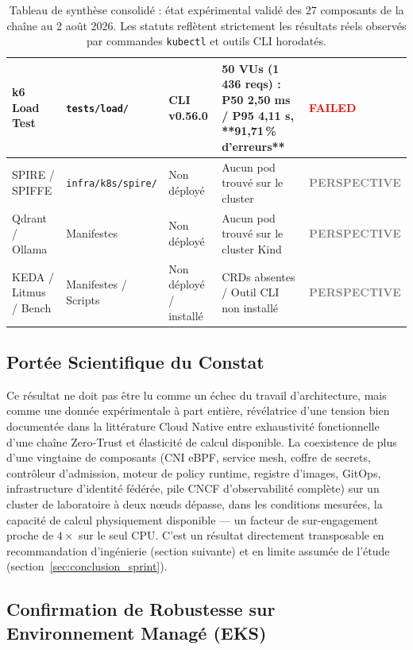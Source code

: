 \begin{table}[H]
\begin{tabular}{@{}p{2.6cm}p{2.2cm}p{2.2cm}p{4.8cm}p{2.0cm}@{}}
k6 Load Test & \texttt{tests/load/} & CLI v0.56.0 & 50 VUs (1\,436 reqs) : P50 2,50 ms / P95 4,11 s, **91,71\,\% d'erreurs** & \textcolor{red}{\textbf{FAILED}} \\
\midrule
SPIRE / SPIFFE & \texttt{infra/k8s/spire/} & Non déployé & Aucun pod trouvé sur le cluster & \textcolor{gray}{\textbf{PERSPECTIVE}} \\
Qdrant / Ollama & Manifestes & Non déployé & Aucun pod trouvé sur le cluster Kind & \textcolor{gray}{\textbf{PERSPECTIVE}} \\
KEDA / Litmus / Bench & Manifestes / Scripts & Non déployé / installé & CRDs absentes / Outil CLI non installé & \textcolor{gray}{\textbf{PERSPECTIVE}} \\
\bottomrule
\end{tabular}
\caption{Tableau de synthèse consolidé : état expérimental validé des 27 composants de la chaîne au 2 août 2026. Les statuts reflètent strictement les résultats réels observés par commandes \texttt{kubectl} et outils CLI horodatés.}
\label{tab:etat_execution_consolide}
\end{table}

\subsection{Portée Scientifique du Constat}

Ce résultat ne doit pas être lu comme un échec du travail d'architecture, mais comme une donnée expérimentale à part entière, révélatrice d'une tension bien documentée dans la littérature Cloud Native entre exhaustivité fonctionnelle d'une chaîne Zero-Trust et élasticité de calcul disponible. La coexistence de plus d'une vingtaine de composants (CNI eBPF, service mesh, coffre de secrets, contrôleur d'admission, moteur de policy runtime, registre d'images, GitOps, infrastructure d'identité fédérée, pile CNCF d'observabilité complète) sur un cluster de laboratoire à deux nœuds dépasse, dans les conditions mesurées, la capacité de calcul physiquement disponible — un facteur de sur-engagement proche de $4\times$ sur le seul CPU. C'est un résultat directement transposable en recommandation d'ingénierie (section suivante) et en limite assumée de l'étude (section~\ref{sec:conclusion_sprint}).

\subsection{Confirmation de Robustesse sur Environnement Managé (EKS)}

